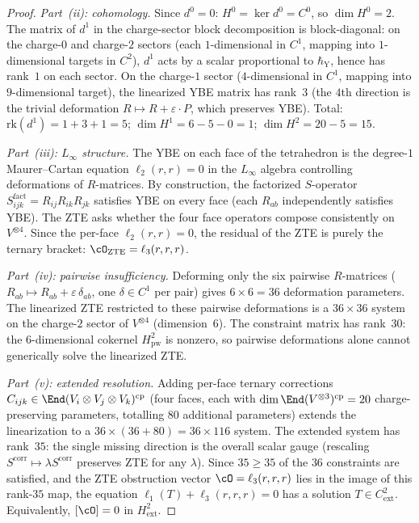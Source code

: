 \begin{proof}
\smallskip\noindent\emph{Part~(ii): cohomology.} Since $d^0 = 0$: $H^0 = \ker d^0 = C^0$, so $\dim H^0 = 2$. The matrix of $d^1$ in the charge-sector block decomposition is block-diagonal: on the charge-$0$ and charge-$2$ sectors (each $1$-dimensional in $C^1$, mapping into $1$-dimensional targets in $C^2$), $d^1$ acts by a scalar proportional to $\hbar_{\mathrm{Y}}$, hence has rank~$1$ on each sector. On the charge-$1$ sector ($4$-dimensional in $C^1$, mapping into $9$-dimensional target), the linearized YBE matrix has rank~$3$ (the $4$th direction is the trivial deformation $R \mapsto R + \varepsilon \cdot P$, which preserves YBE). Total: $\mathrm{rk}(d^1) = 1 + 3 + 1 = 5$; $\dim H^1 = 6 - 5 - 0 = 1$; $\dim H^2 = 20 - 5 = 15$.

\smallskip\noindent\emph{Part~(iii): $L_\infty$ structure.} The YBE on each face of the tetrahedron is the degree-$1$ Maurer--Cartan equation $\ell_2(r,r) = 0$ in the $L_\infty$ algebra controlling deformations of $R$-matrices. By construction, the factorized $S$-operator $S^{\mathrm{fact}}_{ijk} = R_{ij} R_{ik} R_{jk}$ satisfies YBE on every face (each $R_{ab}$ independently satisfies YBE). The ZTE asks whether the four face operators compose consistently on $V^{\otimes 4}$. Since the per-face $\ell_2(r,r) = 0$, the residual of the ZTE is purely the ternary bracket: $\cO_{\mathrm{ZTE}} = \ell_3(r,r,r)$.

\smallskip\noindent\emph{Part~(iv): pairwise insufficiency.} Deforming only the six pairwise $R$-matrices ($R_{ab} \mapsto R_{ab} + \varepsilon\,\delta_{ab}$, one $\delta \in C^1$ per pair) gives $6 \times 6 = 36$ deformation parameters. The linearized ZTE restricted to these pairwise deformations is a $36 \times 36$ system on the charge-$2$ sector of $V^{\otimes 4}$ (dimension~$6$). The constraint matrix has rank~$30$: the $6$-dimensional cokernel $H^2_{\mathrm{pw}}$ is nonzero, so pairwise deformations alone cannot generically solve the linearized ZTE.

\smallskip\noindent\emph{Part~(v): extended resolution.} Adding per-face ternary corrections $C_{ijk} \in \End(V_i \otimes V_j \otimes V_k)^{\mathrm{cp}}$ (four faces, each with $\dim \End(V^{\otimes 3})^{\mathrm{cp}} = 20$ charge-preserving parameters, totalling $80$ additional parameters) extends the linearization to a $36 \times (36 + 80) = 36 \times 116$ system. The extended system has rank~$35$: the single missing direction is the overall scalar gauge (rescaling $S^{\mathrm{corr}} \mapsto \lambda S^{\mathrm{corr}}$ preserves ZTE for any $\lambda$). Since $35 \geq 35$ of the $36$ constraints are satisfied, and the ZTE obstruction vector $\cO = \ell_3(r,r,r)$ lies in the image of this rank-$35$ map, the equation $\ell_1(T) + \ell_3(r,r,r) = 0$ has a solution $T \in C^2_{\mathrm{ext}}$. Equivalently, $[\cO] = 0$ in $H^2_{\mathrm{ext}}$.


\end{proof}
